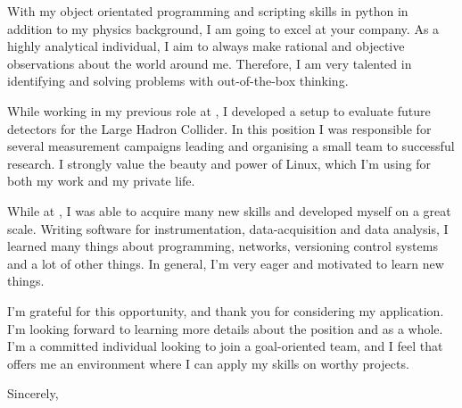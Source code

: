 \documentclass[12pt]{extarticle}
\begin{document}
With my object orientated programming and scripting skills in python in addition to my physics background, I am going to excel at your company.
As a highly analytical individual, I aim to always make rational and objective observations about the world around me.
Therefore, I am very talented in identifying and solving problems with out-of-the-box thinking.\par
%
%
%
While working in my previous role at \@oldcomp, I developed a setup to evaluate future detectors for the Large Hadron Collider.
In this position I was responsible for several measurement campaigns leading and organising a small team to successful research.
I strongly value the beauty and power of Linux, which I'm using for both my work and my private life.\par
%
%
%
While at \@oldcomp, I was able to acquire many new skills and developed myself on a great scale.
Writing software for instrumentation, data-acquisition and data analysis, I learned many things about programming, networks, versioning control systems and a lot of other things.
In general, I'm very eager and motivated to learn new things.\par
%
%
%
I'm grateful for this opportunity, and thank you for considering my application.
I'm looking forward to learning more details about the \@positionshort position and \@company as a whole.
I'm a committed individual looking to join a goal-oriented team, and I feel that \@company offers me an environment where I can apply my skills on worthy projects.\par
%
Sincerely,\par

%
\@author
%
\end{document}
